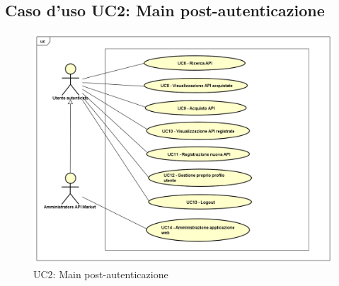 \newpage
\subsection{Caso d'uso UC2: Main post-autenticazione }
\label{UC2}
\begin{figure}[ht]
	\centering
	\includegraphics[scale=0.45]{UML/UC2.png}
	\caption{UC2: Main post-autenticazione}
\end{figure}

